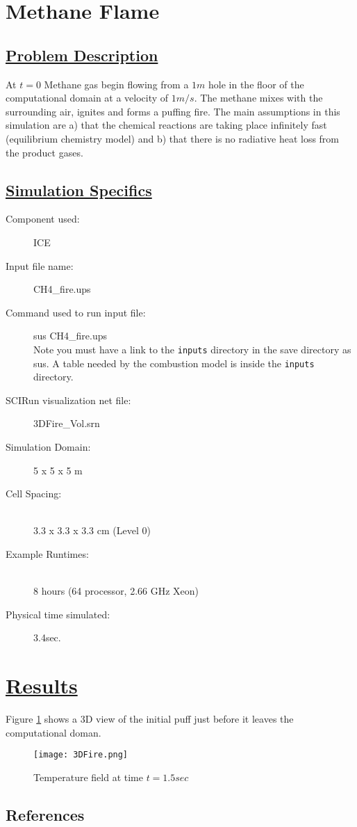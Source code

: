 
\section*{\center Methane Flame}
\subsection*{\underline{Problem Description}}
At $t=0$ Methane gas begin flowing from a $1m$ hole in the floor of the
computational domain at a velocity of $1m/s$.  The methane mixes with the
surrounding air, ignites and forms a puffing fire.  The main assumptions in
this simulation are a) that the chemical reactions are taking place infinitely
fast (equilibrium chemistry model) and b) that there is no radiative heat
loss from the product gases.
\subsection*{\underline{Simulation Specifics}}
\begin{description} 
\item [Component used:] \hfill ICE
\item [Input file name:] \hfill CH4\_fire.ups
\item [Command used to run input file:]\hfill sus CH4\_fire.ups \\
Note you must have a link to the {\tt inputs} directory in the save directory as sus.  A table needed
by the combustion model is inside the {\tt inputs} directory.
\item [SCIRun visualization net file:]\hfill 3DFire\_Vol.srn \\


\item [Simulation Domain:]\hfill    5 x 5 x 5 m
\item [Cell Spacing:]\hfill \\ 
3.3 x 3.3 x 3.3 cm (Level 0)


\item [Example Runtimes:] \hfill \\
 8 hours   (64 processor, 2.66 GHz Xeon)

\item [Physical time simulated:] \hfill 3.4sec.

\end{description}

\section*{\underline{Results}}
Figure \ref{results.CH4} shows a 3D view of the initial puff just before it leaves the computational
doman.  
\begin{figure}
\texttt{[image: 3DFire.png]}
\caption{Temperature field at time $t = 1.5 sec$}
\label{results.CH4}
\end{figure}
\newpage


\subsection{References}




